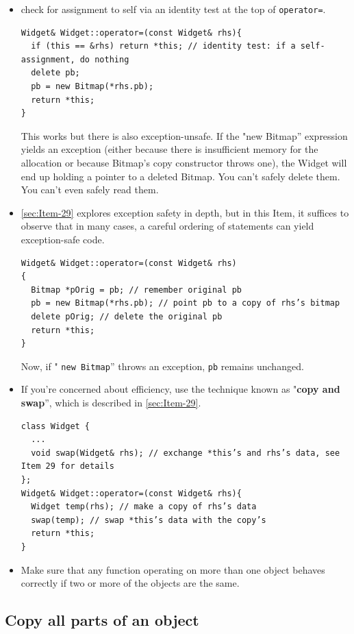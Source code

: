 \documentclass[a4paper,twoside]{article}
\theoremstyle{definition}
\theoremstyle{remark}
\numberwithin{equation}{section}
\let\OldTexttt\texttt
\renewcommand{\texttt}[1]{{\color{blue} \OldTexttt{#1}}}
\begin{document}
\begin{itemize}
\item check for assignment to self via an identity test at the top of
  \texttt{operator=}.
\begin{verbatim}
Widget& Widget::operator=(const Widget& rhs){
  if (this == &rhs) return *this; // identity test: if a self-assignment, do nothing
  delete pb;
  pb = new Bitmap(*rhs.pb);
  return *this;
}
\end{verbatim}
  This works but there is also exception-unsafe. If the "new Bitmap''
  expression yields an exception (either because there is insufficient
  memory for the allocation or because Bitmap's copy constructor
  throws one), the Widget will end up holding a pointer to a deleted
  Bitmap.  You can't safely delete them. You can't even safely read them.

\item  \ref{sec:Item-29} explores exception safety in depth,
but in this Item, it suffices to observe that in many cases, a careful
ordering of statements can yield exception-safe code.
\begin{verbatim}
Widget& Widget::operator=(const Widget& rhs)
{
  Bitmap *pOrig = pb; // remember original pb
  pb = new Bitmap(*rhs.pb); // point pb to a copy of rhs’s bitmap
  delete pOrig; // delete the original pb
  return *this;
}
\end{verbatim}
Now, if "\texttt{new Bitmap}'' throws an exception, \texttt{pb}
remains unchanged. 
\item If you're concerned about efficiency, use the technique known as
  "\textbf{copy and swap}'', which is described in \ref{sec:Item-29}.
\begin{verbatim}
class Widget {
  ...
  void swap(Widget& rhs); // exchange *this’s and rhs’s data, see Item 29 for details
};
Widget& Widget::operator=(const Widget& rhs){
  Widget temp(rhs); // make a copy of rhs’s data
  swap(temp); // swap *this’s data with the copy’s
  return *this;
}
\end{verbatim}
\item Make sure that any function operating on more than one object
  behaves correctly if two or more of the objects are the same.
\end{itemize}

\subsection{Copy all parts of an object}
\label{sec:Item-12}
\end{document}
